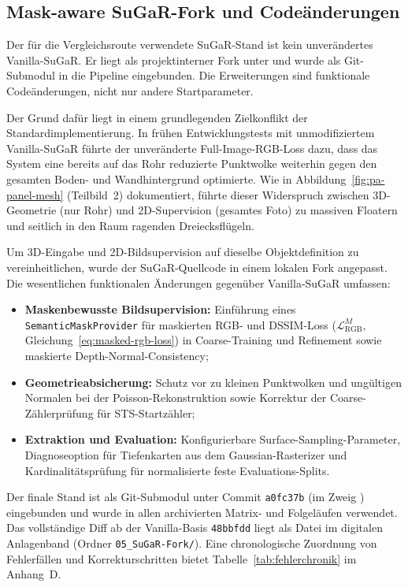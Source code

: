 \subsection{Mask-aware SuGaR-Fork und Codeänderungen}

Der für die Vergleichsroute verwendete SuGaR-Stand ist kein unverändertes
Vanilla-SuGaR. Er liegt als projektinterner Fork unter
 und wurde als Git-Submodul in die Pipeline eingebunden.
Die Erweiterungen sind funktionale Codeänderungen, nicht nur andere
Startparameter.

Der Grund dafür liegt in einem grundlegenden Zielkonflikt der
Standardimplementierung. In frühen Entwicklungstests mit unmodifiziertem
Vanilla-SuGaR führte der unveränderte Full-Image-RGB-Loss dazu, dass das
System eine bereits auf das Rohr reduzierte Punktwolke weiterhin gegen den
gesamten Boden- und Wandhintergrund optimierte. Wie in
Abbildung~\ref{fig:pa-panel-mesh} (Teilbild~2) dokumentiert, führte dieser
Widerspruch zwischen 3D-Geometrie (nur Rohr) und 2D-Supervision (gesamtes
Foto) zu massiven Floatern und seitlich in den Raum ragenden Dreiecksflügeln.

Um 3D-Eingabe und 2D-Bildsupervision auf dieselbe Objektdefinition zu
vereinheitlichen, wurde der SuGaR-Quellcode in einem lokalen Fork angepasst.
Die wesentlichen funktionalen Änderungen gegenüber Vanilla-SuGaR umfassen:

\begin{itemize}
  \item \textbf{Maskenbewusste Bildsupervision:} Einführung eines
        \texttt{SemanticMaskProvider} für maskierten RGB- und DSSIM-Loss
        ($\mathcal{L}_{\mathrm{RGB}}^{M}$, Gleichung~\ref{eq:masked-rgb-loss})
        in Coarse-Training und Refinement sowie maskierte
        Depth-Normal-Consistency;
  \item \textbf{Geometrieabsicherung:} Schutz vor zu kleinen Punktwolken und
        ungültigen Normalen bei der Poisson-Rekonstruktion sowie Korrektur
        der Coarse-Zählerprüfung für STS-Startzähler;
  \item \textbf{Extraktion und Evaluation:} Konfigurierbare Surface-Sampling-Parameter,
        Diagnoseoption für Tiefenkarten aus dem Gaussian-Rasterizer und
        Kardinalitätsprüfung für normalisierte feste Evaluations-Splits.
\end{itemize}

Der finale Stand ist als Git-Submodul unter Commit \texttt{a0fc37b} (im Zweig
) eingebunden und wurde in allen archivierten
Matrix- und Folgeläufen verwendet. Das vollständige Diff ab der Vanilla-Basis
\texttt{48bbfdd} liegt als Datei  im
digitalen Anlagenband (Ordner \texttt{05\_SuGaR-Fork/}). Eine chronologische
Zuordnung von Fehlerfällen und Korrekturschritten bietet Tabelle~\ref{tab:fehlerchronik}
im Anhang~D.

